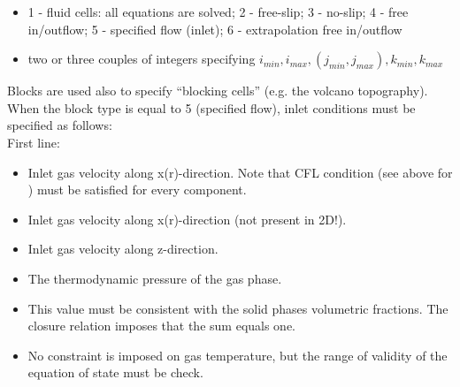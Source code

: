 \begin{itemize}
\item
{}
{1 - fluid cells: all equations are solved; 2 - free-slip;
 3 - no-slip; 4 - free in/outflow; 5 - specified flow (inlet); 
 6 - extrapolation free in/outflow}

\item
{}
{two or three couples of integers specifying 
$ i_{min}, i_{max}, (j_{min}, j_{max}), k_{min}, k_{max}$ }

\end{itemize}

Blocks are used also to specify ``blocking cells'' (e.g. 
the volcano topography). When the block type is equal to 5 (specified
flow), inlet conditions must be specified as follows:\\

First line:

\begin{itemize}
\item
{}
{Inlet gas velocity along x(r)-direction. Note that CFL condition (see above for ) 
must be satisfied for every component.}

\item
{}
{Inlet gas velocity along x(r)-direction (not present in 2D!).}

\item
{}
{Inlet gas velocity along z-direction.}

\item
{}
{The thermodynamic pressure of the gas phase.}

\item
{}
{This value must be consistent with the solid phases volumetric fractions.
The closure relation imposes that the sum equals one.}

\item
{}
{No constraint is imposed on gas temperature, but the range of validity
of the equation of state must be check.}
\end{itemize}


